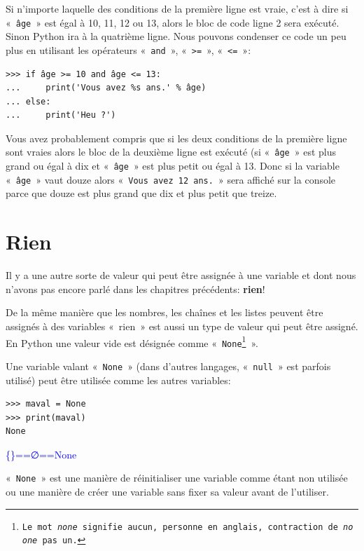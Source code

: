 Si n'importe laquelle des conditions de la première ligne est vraie, c'est à dire si  «~\texttt{âge}~» est égal à 10, 11, 12 ou 13, alors le bloc de code ligne 2 sera exécuté. Sinon Python ira à la quatrième ligne. 
Nous pouvons condenser ce code un peu plus en utilisant les opérateurs «~\texttt{and}~», «~\texttt{>=}~», «~\texttt{<=}~»:

\begin{Verbatim}[frame=single,rulecolor=\color{green}, label=à taper avec attention]
>>> if âge >= 10 and âge <= 13:
...     print('Vous avez %s ans.' % âge)
... else:
...     print('Heu ?')
\end{Verbatim}

Vous avez probablement compris que si les deux conditions de la première ligne sont vraies alors le bloc de la deuxième ligne est exécuté (si «~\texttt{âge}~»  est plus grand ou égal à dix et «~\texttt{âge}~» est plus petit ou égal à 13. Donc si la variable «~\texttt{âge}~» vaut douze alors «~\texttt{Vous avez 12 ans.}~» sera affiché sur la console parce que douze est plus grand que dix et plus petit que treize.

\section{Rien}
Il y a une autre sorte de valeur qui peut être assignée à une variable et dont nous n'avons pas encore parlé dans les chapitres précédents: \textbf{rien}!

De la même manière que les nombres, les chaînes et les listes peuvent être assignés à des variables «~{rien}~»   est aussi un type de valeur qui peut être assigné. En Python une valeur vide est désignée comme «~\texttt{None\footnote{Le mot \emph{none} signifie aucun, personne en anglais, contraction de \emph{no one} pas un.}}~».

Une variable valant «~\texttt{None}~» (dans d'autres langages, «~\texttt{null}~» est parfois utilisé) peut être utilisée comme les autres variables:

\begin{Verbatim}[frame=single,rulecolor=\color{mbleu}, label=à taper]
>>> maval = None
>>> print(maval)
None
\end{Verbatim}

\begin{center}
\textcolor{blue}{\textrm{\{\}==∅==None}}
\end{center}

«~\texttt{None}~» est une manière de réinitialiser une variable comme étant non utilisée ou une manière de créer une variable sans fixer sa valeur avant de l'utiliser.

